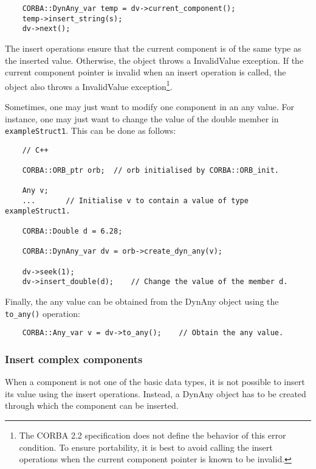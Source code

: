 \documentclass[11pt,twoside,onecolumn]{book}
\begin{document}
{\small
\begin{verbatim}
    CORBA::DynAny_var temp = dv->current_component();
    temp->insert_string(s);
    dv->next();
\end{verbatim}
}

The insert operations ensure that the current component is of the same type
as the inserted value. Otherwise, the object throws a InvalidValue
exception. If the current component pointer is invalid when an insert operation
is called, the object also throws a InvalidValue exception\footnote{The
CORBA 2.2 specification does not define the behavior of this error
condition. To ensure portability, it is best to avoid calling the insert
operations when the current component pointer is known to be invalid.}.

Sometimes, one may just want to modify one component in an any value. For
instance, one may just want to change the value of the double member in
{\tt exampleStruct1}. This can be done as follows:

{\small
\begin{verbatim}
    // C++
    
    CORBA::ORB_ptr orb;  // orb initialised by CORBA::ORB_init.
    
    Any v;
    ...       // Initialise v to contain a value of type exampleStruct1.
    
    CORBA::Double d = 6.28;
    
    CORBA::DynAny_var dv = orb->create_dyn_any(v);
    
    dv->seek(1);
    dv->insert_double(d);    // Change the value of the member d.
\end{verbatim}
}

Finally, the any value can be obtained from the DynAny object using the
{\tt to\_any()} operation:

{\small
\begin{verbatim}
    CORBA::Any_var v = dv->to_any();    // Obtain the any value.
\end{verbatim}
}

\subsubsection{Insert complex components}

When a component is not one of the basic data types, it is not possible to
insert its value using the insert operations. Instead, a DynAny object has
to be created through which the component can be inserted.
\end{document}
